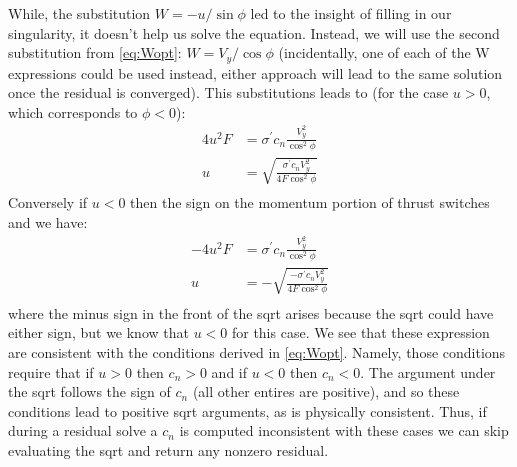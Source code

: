 \documentclass{article}
\begin{document}
While, the substitution $W = -u/\sin\phi$ led to the insight of filling in our singularity, it doesn't help us solve the equation.  Instead, we will use the second substitution from \cref{eq:Wopt}: $W = V_y / \cos\phi$ (incidentally, one of each of the W expressions could be used instead, either approach will lead to the same solution once the residual is converged).  This substitutions leads to (for the case $u > 0$, which corresponds to $\phi < 0$):
\begin{equation}
\begin{aligned}
4 u^2 F&= \sigma^\prime c_n \frac{V_y^2}{\cos^2\phi}\\
u&= \sqrt{\frac{\sigma^\prime c_n V_y^2}{4 F \cos^2\phi}}\\
\end{aligned}
\end{equation}
Conversely if $u < 0$ then the sign on the momentum portion of thrust switches and we have:
\begin{equation}
\begin{aligned}
- 4 u^2 F&= \sigma^\prime c_n \frac{V_y^2}{\cos^2\phi}\\
u&= -\sqrt{\frac{-\sigma^\prime c_n V_y^2}{4 F \cos^2\phi}}\\
\end{aligned}
\end{equation}
where the minus sign in the front of the sqrt arises because the sqrt could have either sign, but we know that $u < 0$ for this case.  We see that these expression are consistent with the conditions derived in \cref{eq:Wopt}.  Namely, those conditions require that if $u > 0$ then $c_n > 0$ and if $u < 0$ then $c_n < 0$.  The argument under the sqrt follows the sign of $c_n$ (all other entires are positive), and so these conditions lead to positive sqrt arguments, as is physically consistent.  Thus, if during a residual solve a $c_n$ is computed inconsistent with these cases we can skip evaluating the sqrt and return any nonzero residual.

\end{document}
